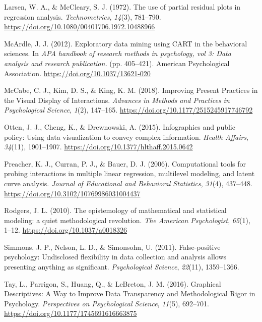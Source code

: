 \documentclass[
  man,floatsintext]{apa6}
\newlength{\cslhangindent}
\newenvironment{CSLReferences}[2] %
 {\begin{list}{}{%
  \setlength{\itemindent}{0pt}
  \setlength{\leftmargin}{0pt}
  \setlength{\parsep}{0pt}
  \ifodd #1
   \setlength{\leftmargin}{\cslhangindent}
   \setlength{\itemindent}{-1\cslhangindent}
  \fi
  \setlength{\itemsep}{#2\baselineskip}}}
 {\end{list}}
\begin{document}
\begin{CSLReferences}{1}{0}
Larsen, W. A., \& McCleary, S. J. (1972). The use of partial residual plots in regression analysis. \emph{Technometrics}, \emph{14}(3), 781--790. \url{https://doi.org/10.1080/00401706.1972.10488966}

McArdle, J. J. (2012). {Exploratory data mining using CART in the behavioral sciences.} In \emph{APA handbook of research methods in psychology, vol 3: Data analysis and research publication.} (pp. 405--421). American Psychological Association. \url{https://doi.org/10.1037/13621-020}

McCabe, C. J., Kim, D. S., \& King, K. M. (2018). {Improving Present Practices in the Visual Display of Interactions}. \emph{Advances in Methods and Practices in Psychological Science}, \emph{1}(2), 147--165. \url{https://doi.org/10.1177/2515245917746792}

Otten, J. J., Cheng, K., \& Drewnowski, A. (2015). Infographics and public policy: Using data visualization to convey complex information. \emph{Health Affairs}, \emph{34}(11), 1901--1907. \url{https://doi.org/10.1377/hlthaff.2015.0642}

Preacher, K. J., Curran, P. J., \& Bauer, D. J. (2006). Computational tools for probing interactions in multiple linear regression, multilevel modeling, and latent curve analysis. \emph{Journal of Educational and Behavioral Statistics}, \emph{31}(4), 437--448. \url{https://doi.org/10.3102/10769986031004437}

Rodgers, J. L. (2010). {The epistemology of mathematical and statistical modeling: a quiet methodological revolution}. \emph{The American Psychologist}, \emph{65}(1), 1--12. \url{https://doi.org/10.1037/a0018326}

Simmons, J. P., Nelson, L. D., \& Simonsohn, U. (2011). {False-positive psychology: Undisclosed flexibility in data collection and analysis allows presenting anything as significant}. \emph{Psychological Science}, \emph{22}(11), 1359--1366.

Tay, L., Parrigon, S., Huang, Q., \& LeBreton, J. M. (2016). {Graphical Descriptives: A Way to Improve Data Transparency and Methodological Rigor in Psychology}. \emph{Perspectives on Psychological Science}, \emph{11}(5), 692--701. \url{https://doi.org/10.1177/1745691616663875}


\end{CSLReferences}
\end{document}
